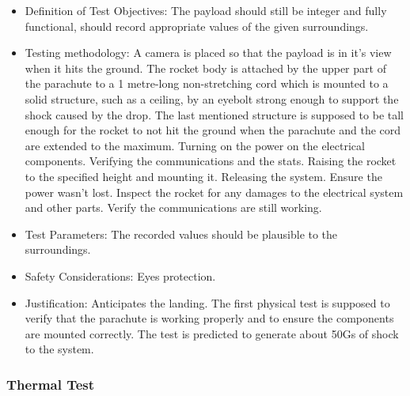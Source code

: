 \begin{itemize}
 \item Definition of Test Objectives: The payload should still be integer and fully functional, should record appropriate values of the given surroundings.
 \item Testing methodology: A camera is placed so that the payload is in it’s view when it hits the ground. The rocket body is attached by the upper part of the parachute to a 1 metre-long non-stretching cord which is mounted to a solid structure, such as a ceiling, by an eyebolt strong enough to support the shock caused by the drop. The last mentioned structure is supposed to be tall enough for the rocket to not hit the ground when the parachute and the cord are extended to the maximum. Turning on the power on the electrical components. Verifying the communications and the stats. Raising the rocket to the specified height and mounting it. Releasing the system. Ensure the power wasn’t lost. Inspect the rocket for any damages to the electrical system and other parts. Verify the communications are still working.
 \item Test Parameters: The recorded values should be plausible to the surroundings.
 \item Safety Considerations: Eyes protection.
 \item Justification: Anticipates the landing. The first physical test is supposed to verify that the parachute is working properly and to ensure the components are mounted correctly. The test is predicted to generate about 50Gs of shock to the system.
\end{itemize}

\subsubsection{Thermal Test}

